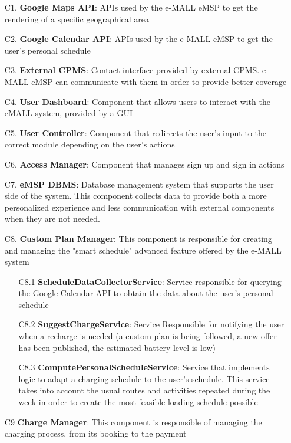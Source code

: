\documentclass[12pt]{report}
\begin{document}
\begin{itemize}
    \item[C1.]\textbf{Google Maps API}: APIs used by the e-MALL eMSP to get the rendering of a specific geographical area
    \item [C2.] \textbf{Google Calendar API}: APIs used by the e-MALL eMSP to get the user's personal schedule 
    \item [C3.] \textbf{External CPMS}: Contact interface provided by external CPMS. e-MALL eMSP can communicate with them in order to provide better coverage 
    \item [C4.] \textbf{User Dashboard}: Component that allows users to interact with the eMALL system, provided by a GUI
    \item [C5.] \textbf {User Controller}: Component that redirects the user's input to the correct module depending on the user's actions
    \item [C6.] \textbf {Access Manager}: Component that manages sign up and sign in actions
    \item [C7.] \textbf{eMSP DBMS}: Database management system that supports the user side of the system. This component collects data to provide both a more personalized experience and less communication with external components when they are not needed.
    \item [C8.] \textbf{Custom Plan Manager}: This component is responsible for creating and managing the "smart schedule" advanced feature offered by the e-MALL system
        \begin{itemize}
            \item[C8.1]\textbf{ScheduleDataCollectorService}: Service responsible for querying the Google Calendar API to obtain the data about the user's personal schedule
            \item [C8.2]\textbf{SuggestChargeService}: Service Responsible for notifying the user when a recharge is needed (a custom plan is being followed, a new offer has been published, the estimated battery level is low)
            \item [C8.3]\textbf{ComputePersonalScheduleService}: Service that implements logic to adapt a charging schedule to the user's schedule. This service takes into account the usual routes and activities  repeated during the week in order to create the most feasible loading schedule possible
        \end{itemize}
    \item [C9] \textbf{Charge Manager}: This component is responsible of managing the charging process, from its booking to the payment

\end{itemize}
\end{document}
